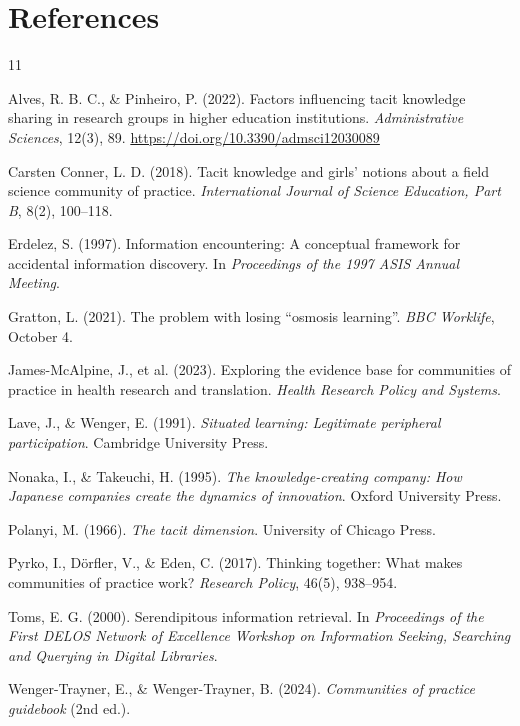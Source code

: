 \documentclass[11pt,a4paper]{article}
\begin{document}
\section*{References}
\begin{thebibliography}{11}

Alves, R. B. C., \& Pinheiro, P. (2022). Factors influencing tacit knowledge sharing in research groups in higher education institutions. \emph{Administrative Sciences}, 12(3), 89. \href{https://doi.org/10.3390/admsci12030089}{https://doi.org/10.3390/admsci12030089}

Carsten Conner, L. D. (2018). Tacit knowledge and girls' notions about a field science community of practice. \emph{International Journal of Science Education, Part B}, 8(2), 100--118.

Erdelez, S. (1997). Information encountering: A conceptual framework for accidental information discovery. In \emph{Proceedings of the 1997 ASIS Annual Meeting}.

Gratton, L. (2021). The problem with losing ``osmosis learning''. \emph{BBC Worklife}, October 4.

James-McAlpine, J., et al. (2023). Exploring the evidence base for communities of practice in health research and translation. \emph{Health Research Policy and Systems}.

Lave, J., \& Wenger, E. (1991). \emph{Situated learning: Legitimate peripheral participation}. Cambridge University Press.

Nonaka, I., \& Takeuchi, H. (1995). \emph{The knowledge-creating company: How Japanese companies create the dynamics of innovation}. Oxford University Press.

Polanyi, M. (1966). \emph{The tacit dimension}. University of Chicago Press.

Pyrko, I., Dörfler, V., \& Eden, C. (2017). Thinking together: What makes communities of practice work? \emph{Research Policy}, 46(5), 938--954.

Toms, E. G. (2000). Serendipitous information retrieval. In \emph{Proceedings of the First DELOS Network of Excellence Workshop on Information Seeking, Searching and Querying in Digital Libraries}.

Wenger-Trayner, E., \& Wenger-Trayner, B. (2024). \emph{Communities of practice guidebook} (2nd ed.).

\end{thebibliography}
\end{document}
